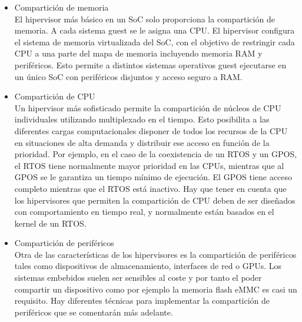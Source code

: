\begin{itemize}
	\item Compartición de memoria\\
	El hipervisor más básico en un \acrshort{SoC} solo proporciona la compartición de memoria. A cada sistema guest se le asigna una CPU. El hipervisor configura el sistema de memoria virtualizada del \acrshort{SoC}, con el objetivo de restringir cada CPU a una parte del mapa de memoria incluyendo memoria RAM y periféricos. Esto permite a distintos sistemas operativos guest ejecutarse en un único \acrshort{SoC} con periféricos disjuntos y acceso seguro a \acrshort{RAM}.
	\item Compartición de CPU\\
	Un hipervisor más sofisticado permite la compartición de núcleos de CPU individuales utilizando multiplexado en el tiempo. Esto posibilita a las diferentes cargas computacionales disponer de todos los recursos de la CPU en situaciones de alta demanda y distribuir ese acceso en función de la prioridad. Por ejemplo, en el caso de la coexistencia de un \acrshort{RTOS} y un \acrshort{GPOS}, el \acrshort{RTOS} tiene normalmente mayor prioridad en las CPUs, mientras que al \acrshort{GPOS} se le garantiza un tiempo mínimo de ejecución. El \acrshort{GPOS} tiene acceso completo mientras que el \acrshort{RTOS} está inactivo. Hay que tener en cuenta que los hipervisores que permiten la compartición de CPU deben de ser diseñados con comportamiento en tiempo real, y normalmente están basados en el kernel de un \acrshort{RTOS}.
	\item Compartición de periféricos\\
	Otra de las características de los hipervisores es la compartición de periféricos tales como dispositivos de almacenamiento, interfaces de red o \acrshort{GPU}s. Los sistemas embebidos suelen ser sensibles al coste y por tanto el poder compartir un dispositivo como por ejemplo la memoria flash \acrshort{eMMC} es casi un requisito. Hay diferentes técnicas para implementar la compartición de periféricos que se comentarán más adelante.\\
\end{itemize}


